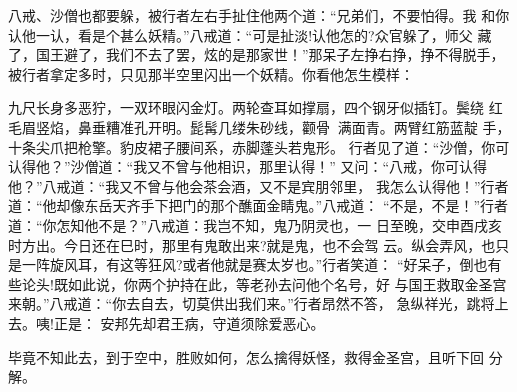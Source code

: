 八戒、沙僧也都要躲，被行者左右手扯住他两个道：“兄弟们，不要怕得。我
和你认他一认，看是个甚么妖精。”八戒道：“可是扯淡!认他怎的?众官躲了，师父
藏了，国王避了，我们不去了罢，炫的是那家世！”那呆子左挣右挣，挣不得脱手，
被行者拿定多时，只见那半空里闪出一个妖精。你看他怎生模样：

九尺长身多恶狞，一双环眼闪金灯。两轮查耳如撑扇，四个钢牙似插钉。鬓绕
红毛眉竖焰，鼻垂糟准孔开明。髭髯几缕朱砂线，颧骨满面青。两臂红筋蓝靛
手，十条尖爪把枪擎。豹皮裙子腰间系，赤脚蓬头若鬼形。
行者见了道：“沙僧，你可认得他？”沙僧道：“我又不曾与他相识，那里认得！”
又问：“八戒，你可认得他？”八戒道：“我又不曾与他会茶会酒，又不是宾朋邻里，
我怎么认得他！”行者道：“他却像东岳天齐手下把门的那个醮面金睛鬼。”八戒道：
“不是，不是！”行者道：“你怎知他不是？”八戒道：我岂不知，鬼乃阴灵也，一
日至晚，交申酉戌亥时方出。今日还在巳时，那里有鬼敢出来?就是鬼，也不会驾
云。纵会弄风，也只是一阵旋风耳，有这等狂风?或者他就是赛太岁也。”行者笑道：
“好呆子，倒也有些论头!既如此说，你两个护持在此，等老孙去问他个名号，好
与国王救取金圣宫来朝。”八戒道：“你去自去，切莫供出我们来。”行者昂然不答，
急纵祥光，跳将上去。咦!正是：
安邦先却君王病，守道须除爱恶心。

毕竟不知此去，到于空中，胜败如何，怎么擒得妖怪，救得金圣宫，且听下回
分解。